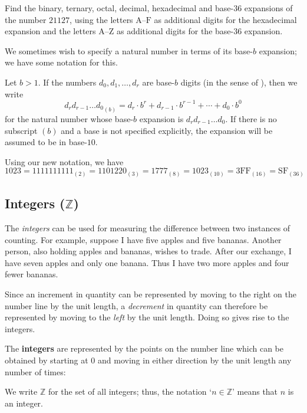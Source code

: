 \begin{exercise}
Find the binary, ternary, octal, decimal, hexadecimal and base-$36$ expansions of the number $21127$, using the letters $\mathrm{A}$--$\mathrm{F}$ as additional digits for the hexadecimal expansion and the letters $\mathrm{A}$--$\mathrm{Z}$ as additional digits for the base-$36$ expansion.
\end{exercise}

We sometimes wish to specify a natural number in terms of its base-$b$ expansion; we have some notation for this.

\begin{notation}
Let $b>1$. If the numbers $d_0,d_1,\dots,d_r$ are base-$b$ digits (in the sense of ), then we write
\[ {d_rd_{r-1} \dots d_0}_{(b)} = d_r \cdot b^r + d_{r-1} \cdot b^{r-1} + \cdots + d_0 \cdot b^0 \]
for the natural number whose base-$b$ expansion is $d_rd_{r-1} \dots d_0$. If there is no subscript $(b)$ and a base is not specified explicitly, the expansion will be assumed to be in base-$10$.
\end{notation}

\begin{example}
Using our new notation, we have
\[ 1023 = 1111111111_{(2)} = 1101220_{(3)} = 1777_{(8)} = 1023_{(10)} = 3\mathrm{FF}_{(16)} = \mathrm{SF}_{(36)} \]
\end{example}

\subsection*{Integers ($\mathbb{Z}$)}

The \textit{integers} can be used for measuring the difference between two instances of counting. For example, suppose I have five apples and five bananas. Another person, also holding apples and bananas, wishes to trade. After our exchange, I have seven apples and only one banana. Thus I have two more apples and four fewer bananas.

Since an increment in quantity can be represented by moving to the right on the number line by the unit length, a \textit{decrement} in quantity can therefore be represented by moving to the \textit{left} by the unit length. Doing so gives rise to the integers.

\begin{definition}
\label{defIntegersInformal}
The \textbf{integers} are represented by the points on the number line which can be obtained by starting at $0$ and moving in either direction by the unit length any number of times:
\begin{center}
\end{center}
We write $\mathbb{Z}$  for the set of all integers; thus, the notation `$n \in \mathbb{Z}$' means that $n$ is an integer.
\end{definition}

